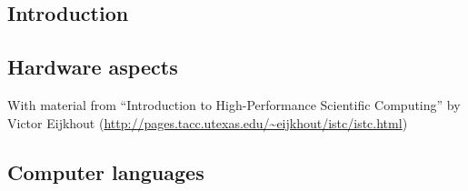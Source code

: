 \documentclass[9pt,xcolor={svgnames},hyperref={colorlinks,urlcolor=DarkBlue}]{beamer}
\begin{document}
\titleframe{}




\begin{frame}
  \section{Introduction}
\end{frame}



\begin{frame}
  \section{Hardware aspects}
   With material from ``Introduction to High-Performance Scientific
  Computing'' by Victor Eijkhout
  (\url{http://pages.tacc.utexas.edu/~eijkhout/istc/istc.html})
\end{frame}




\begin{frame}
  \section{Computer languages}
\end{frame}

\end{document}
